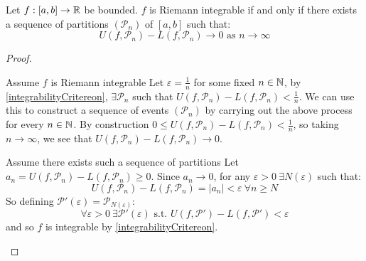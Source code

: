 \documentclass[../main.tex]{subfiles}
\begin{document}
\begin{proposition}
  Let $f: [a, b] \to \mathbb{R}$ be bounded.
  $f$ is Riemann integrable if and only if there exists a sequence of partitions $(\mathcal{P}_n)$ of $[a, b]$ such that:
  \label{integrableSequence}
  \[
    U(f, \mathcal{P}_n) - L(f, \mathcal{P}_n) \to 0 \text{ as } n \to \infty
  \]
\end{proposition}
\begin{proof}
  \begin{proofdirection}{Assume $f$ is Riemann integrable}
    Let $\varepsilon = \frac{1}{n}$ for some fixed $n \in \mathbb{N}$, by \cref{integrabilityCritereon}, $\exists \mathcal{P}_n$ such that $U(f, \mathcal{P}_n) - L(f, \mathcal{P}_n) < \frac{1}{n}$.
    We can use this to construct a sequence of events $(\mathcal{P}_n)$ by carrying out the above process for every $n \in \mathbb{N}$.
    By construction $0 \leq U(f, \mathcal{P}_n) - L(f, \mathcal{P}_n) < \frac{1}{n}$, so taking $n \to \infty$, we see that $U(f, \mathcal{P}_n) - L(f, \mathcal{P}_n) \to 0$.
  \end{proofdirection}
  \begin{proofdirection}{Assume there exists such a sequence of partitions}
    Let $a_n = U(f, \mathcal{P}_n) - L(f, \mathcal{P}_n) \geq 0$.
    Since $a_n \to 0$, for any $\varepsilon > 0\ \exists N(\varepsilon)$ such that:
    \[
      U(f, \mathcal{P}_n) - L(f, \mathcal{P}_n) = |a_n| < \varepsilon\ \forall n \geq N
    \]
    So defining $\mathcal{P}'(\varepsilon) = \mathcal{P}_{N(\varepsilon)}$:
    \[
      \forall \varepsilon > 0\ \exists \mathcal{P}'(\varepsilon) \text{ s.t. } U(f, \mathcal{P}') - L(f, \mathcal{P}') < \varepsilon
    \]
    and so $f$ is integrable by \cref{integrabilityCritereon}.
  \end{proofdirection}
\end{proof}
\end{document}
